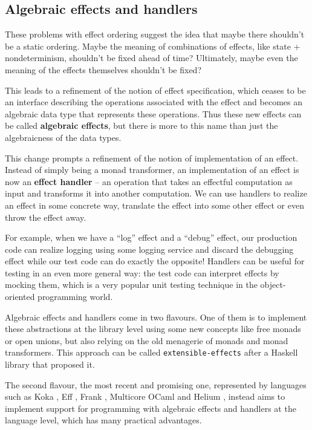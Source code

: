 \documentclass[declaration,inz,english,shortabstract]{iithesis}
\newcommand{\m}[1]{\texttt{#1}}
\begin{document}
\subsection{Algebraic effects and handlers}

These problems with effect ordering suggest the idea that maybe there shouldn't be a static ordering. Maybe the meaning of combinations of effects, like state + nondeterminism, shouldn't be fixed ahead of time? Ultimately, maybe even the meaning of the effects themselves shouldn't be fixed?

This leads to a refinement of the notion of effect specification, which ceases to be an interface describing the operations associated with the effect and becomes an algebraic data type that represents these operations. Thus these new effects can be called \textbf{algebraic effects}, but there is more to this name than just the algebraicness of the data types.

This change prompts a refinement of the notion of implementation of an effect. Instead of simply being a monad transformer, an implementation of an effect is now an \textbf{effect handler} -- an operation that takes an effectful computation as input and transforms it into another computation. We can use handlers to realize an effect in some concrete way, translate the effect into some other effect or even throw the effect away.

For example, when we have a ``log'' effect and a ``debug'' effect, our production code can realize logging using some logging service and discard the debugging effect while our test code can do exactly the opposite! Handlers can be useful for testing in an even more general way: the test code can interpret effects by mocking them, which is a very popular unit testing technique in the object-oriented programming world.

Algebraic effects and handlers come in two flavours. One of them is to implement these abstractions at the library level using some new concepts like free monads or open unions, but also relying on the old menagerie of monads and monad transformers. This approach can be called \m{extensible-effects} after a Haskell library that proposed it. \cite{ExtensibleEffects} \cite{Freer}

The second flavour, the most recent and promising one, represented by languages such as Koka \cite{Koka}, Eff \cite{Eff}, Frank \cite{Frank}, Multicore OCaml \cite{MulticoreOCaml} and Helium \cite{Helium}, instead aims to implement support for programming with algebraic effects and handlers at the language level, which has many practical advantages.
\end{document}
